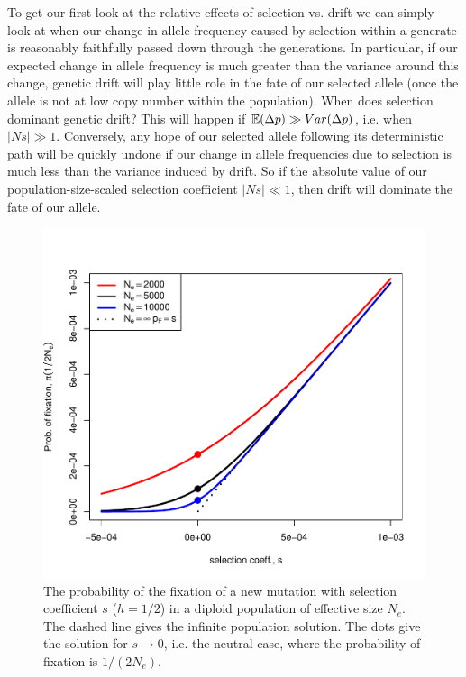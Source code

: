 {To get our first look at the relative effects of selection vs. drift we
can simply look at when our change in allele frequency caused by
selection within a generate is reasonably faithfully passed down through the generations. In particular, if our expected change in allele frequency is much greater than the variance around this change, genetic drift will play little role in the fate of our selected allele (once the allele is not at low copy number within the population). When does selection dominant genetic drift? This will happen if $\mathbb{E}(\Delta p) \gg Var(\Delta p)$, i.e. when $|Ns| \gg 1$. Conversely, any hope of our selected allele following its deterministic path will be quickly undone if our change in allele frequencies due to selection is
much less than the variance induced by drift. So if the absolute value of our population-size-scaled selection coefficient $| Ns| \ll 1$, then drift will dominate the fate of our allele. \\
\begin{figure}
\begin{center}
\includegraphics[width=0.9 \textwidth]{figures/prob_fix_diffusion.pdf}
\end{center}
\caption{The probability of the fixation of a new mutation with
  selection coefficient $s$ ($h=1/2$) in a diploid population of effective
  size $N_e$. The dashed line gives the infinite population
  solution. The dots give the solution for $s \rightarrow 0$, i.e. the
  neutral case, where the probability of fixation is $1/(2N_e)$. } \label{fig:prob_fix_diffusion}
\end{figure}

}
